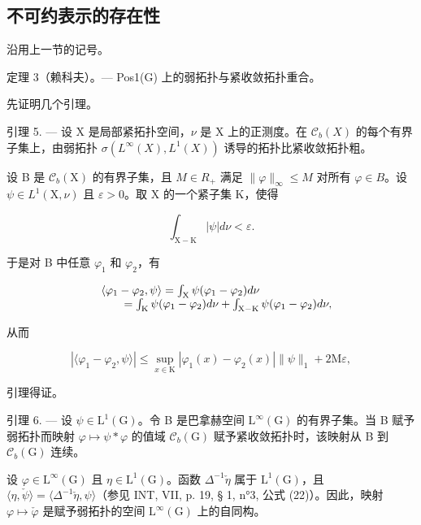 \subsection{不可约表示的存在性}

沿用上一节的记号。

定理 3（赖科夫）。--- Pos1(G) 上的弱拓扑与紧收敛拓扑重合。

先证明几个引理。

引理 5. --- 设 X 是局部紧拓扑空间，\(\nu\) 是 X 上的正测度。在 \(\mathcal{C}_{b}(X)\) 的每个有界子集上，由弱拓扑 \(\sigma(L^{\infty}(X), L^{1}(X))\) 诱导的拓扑比紧收敛拓扑粗。

设 B 是 \(\mathcal{C}_{b}(\mathrm{X})\) 的有界子集，且 \(M \in R_{+}\) 满足 \(\|\varphi\|_{\infty} \leqslant M\) 对所有 \(\varphi \in B\)。设 \(\psi \in L^{1}(\mathrm{X}, \nu)\) 且 \(\varepsilon > 0\)。取 X 的一个紧子集 K，使得

\[
\int_ {\mathrm{X-K}} | \psi | d \nu <   \varepsilon .
\]

于是对 B 中任意 \(\varphi_{1}\) 和 \(\varphi_{2}\)，有

\[
\begin{array}{r l} & {\langle \varphi_ {1} - \varphi_ {2}, \psi \rangle = \int_ {\mathrm{X}} \psi (\varphi_ {1} - \varphi_ {2}) d \nu} \\ & {\qquad = \int_ {\mathrm{K}} \psi (\varphi_ {1} - \varphi_ {2}) d \nu + \int_ {\mathrm{X-K}} \psi (\varphi_ {1} - \varphi_ {2}) d \nu ,} \end{array}
\]

从而

\[
| \langle \varphi_ {1} - \varphi_ {2}, \psi \rangle | \leqslant \sup _ {x \in \mathrm{K}} | \varphi_ {1} (x) - \varphi_ {2} (x) | \| \psi \| _ {1} + 2 \mathrm{M} \varepsilon ,
\]

引理得证。

引理 6. --- 设 \(\psi \in \mathrm{L}^{1}(\mathrm{G})\)。令 B 是巴拿赫空间 \(\mathrm{L}^{\infty}(\mathrm{G})\) 的有界子集。当 B 赋予弱拓扑而映射 \(\varphi \mapsto \psi * \varphi\) 的值域 \(\mathcal{C}_b(\mathrm{G})\) 赋予紧收敛拓扑时，该映射从 B 到 \(\mathcal{C}_b(\mathrm{G})\) 连续。

设 \(\varphi\in\mathrm{L}^{\infty}(\mathrm{G})\) 且 \(\eta\in\mathrm{L}^{1}(\mathrm{G})\)。函数 \(\Delta^{-1}\check{\eta}\) 属于 \(\mathrm{L}^{1}(\mathrm{G})\)，且 \(\langle\eta,\check{\psi}\rangle=\langle\Delta^{-1}\check{\eta},\psi\rangle\)（参见 INT, VII, p. 19, § 1, n°3, 公式 (22)）。因此，映射 \(\varphi\mapsto\check{\varphi}\) 是赋予弱拓扑的空间 \(\mathrm{L}^{\infty}(\mathrm{G})\) 上的自同构。

